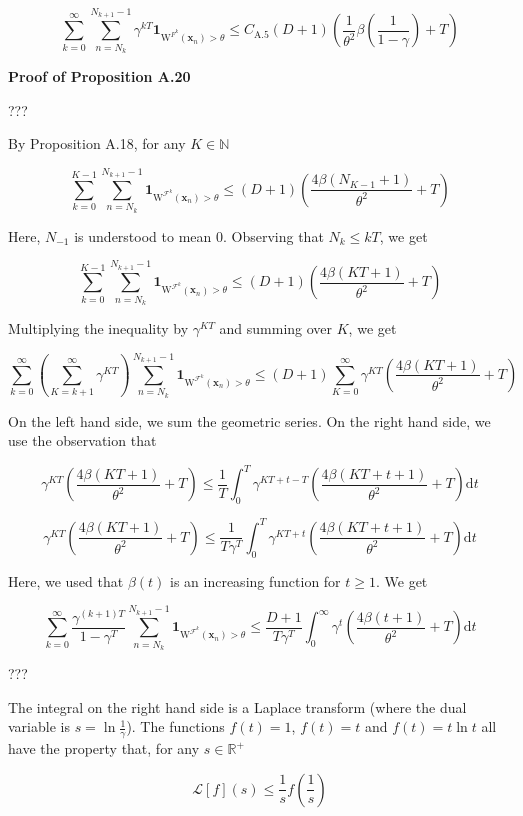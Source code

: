 \documentclass[a4paper]{article}
\newcommand{\Co}[1]{}
\newcommand{\AP}[1]{\left(#1\right)}
\newcommand{\Nats}{\mathbb{N}}
\newcommand{\Reals}{\mathbb{R}}
\newcommand{\D}{\mathrm{d}} %
\newcommand{\F}{\mathcal{F}}
\newcommand{\W}{\mathrm{W}}
\begin{document}
$$\sum_{k=0}^\infty\sum_{n=N_k}^{N_{k+1}-1}{\gamma^{kT}\boldsymbol{1}_{\W^{F^k}\AP{\boldsymbol{x}_{n}}>\theta}} \leq C_{\mathrm{A.5}}(D+1)\AP{\frac{1}{\theta^2}\beta\AP{\frac{1}{1-\gamma}}+T}$$

\textbf{Proof of Proposition A.20}\Co{b}

???

By Proposition A.18, for any $K\in\Nats$

$$\sum_{k=0}^{K-1}\sum_{n=N_k}^{N_{k+1}-1}{\boldsymbol{1}_{\W^{\F^k}\AP{\boldsymbol{x}_{n}}>\theta}
} \leq(D+1)\AP{\frac{4\beta\AP{N_{K-1}+1}}{\theta^{2}}+T}$$

Here, $N_{-1}$ is understood to mean $0$. Observing that $N_k\leq kT$, we get

$$\sum_{k=0}^{K-1}\sum_{n=N_k}^{N_{k+1}-1}{\boldsymbol{1}_{\W^{\F^k}\AP{\boldsymbol{x}_{n}}>\theta}
} \leq(D+1)\AP{\frac{4\beta\AP{KT+1}}{\theta^{2}}+T}$$

Multiplying the inequality by $\gamma^{KT}$ and summing over $K$, we get

$$\sum_{k=0}^{\infty}\AP{\sum_{K=k+1}^\infty \gamma^{KT}}\sum_{n=N_k}^{N_{k+1}-1}{\boldsymbol{1}_{\W^{\F^k}\AP{\boldsymbol{x}_{n}}>\theta}} \leq(D+1)\sum_{K=0}^\infty\gamma^{KT}\AP{\frac{4\beta\AP{KT+1}}{\theta^{2}}+T}$$

On the left hand side, we sum the geometric series. On the right hand side, we use the observation that

$$\gamma^{KT}\AP{\frac{4\beta\AP{KT+1}}{\theta^{2}}+T} \leq \frac{1}{T}\int_0^T \gamma^{KT+t-T}\AP{\frac{4\beta\AP{KT+t+1}}{\theta^2}+T}\D t$$

$$\gamma^{KT}\AP{\frac{4\beta\AP{KT+1}}{\theta^{2}}+T} \leq \frac{1}{T\gamma^T}\int_0^T \gamma^{KT+t}\AP{\frac{4\beta\AP{KT+t+1}}{\theta^2}+T}\D t$$

Here, we used that $\beta(t)$ is an increasing function for $t\geq 1$. We get

$$\sum_{k=0}^{\infty}\frac{\gamma^{(k+1)T}}{1-\gamma^T}\sum_{n=N_k}^{N_{k+1}-1}{\boldsymbol{1}_{\W^{\F^k}\AP{\boldsymbol{x}_{n}}>\theta}} \leq \frac{D+1}{T\gamma^T}\int_0^\infty\gamma^{t}\AP{\frac{4\beta(t+1)}{\theta^2}+T}\D t$$

???

The integral on the right hand side is a Laplace transform (where the dual variable is $s=\ln\frac{1}{\gamma}$). The functions $f(t)=1$, $f(t)=t$ and $f(t)=t\ln{t}$ all have the property that, for any $s\in\Reals^+$

$$\mathcal{L}[f](s)\leq \frac{1}{s}f\AP{\frac{1}{s}}$$
\end{document}
